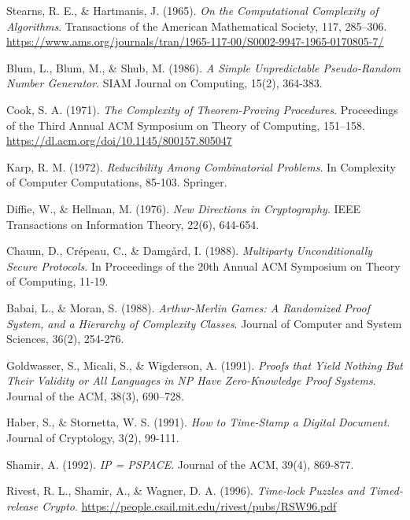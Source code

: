 \documentclass[12pt]{report}
\begin{document}
\begin{thebibliography}{9}

Stearns, R. E., \& Hartmanis, J. (1965). \textit{On the Computational Complexity of Algorithms}. Transactions of the American Mathematical Society, 117, 285–306. \url{https://www.ams.org/journals/tran/1965-117-00/S0002-9947-1965-0170805-7/}

Blum, L., Blum, M., \& Shub, M. (1986). \textit{A Simple Unpredictable Pseudo-Random Number Generator}. SIAM Journal on Computing, 15(2), 364-383.

Cook, S. A. (1971). \textit{The Complexity of Theorem-Proving Procedures}. Proceedings of the Third Annual ACM Symposium on Theory of Computing, 151–158. \url{https://dl.acm.org/doi/10.1145/800157.805047}

Karp, R. M. (1972). \textit{Reducibility Among Combinatorial Problems}. In Complexity of Computer Computations, 85-103. Springer.

Diffie, W., \& Hellman, M. (1976). \textit{New Directions in Cryptography}. IEEE Transactions on Information Theory, 22(6), 644-654.

Chaum, D., Crépeau, C., \& Damgård, I. (1988). \textit{Multiparty Unconditionally Secure Protocols}. In Proceedings of the 20th Annual ACM Symposium on Theory of Computing, 11-19.

Babai, L., \& Moran, S. (1988). \textit{Arthur-Merlin Games: A Randomized Proof System, and a Hierarchy of Complexity Classes}. Journal of Computer and System Sciences, 36(2), 254-276.

Goldwasser, S., Micali, S., \& Wigderson, A. (1991). \textit{Proofs that Yield Nothing But Their Validity or All Languages in NP Have Zero-Knowledge Proof Systems}. Journal of the ACM, 38(3), 690–728.

Haber, S., \& Stornetta, W. S. (1991). \textit{How to Time-Stamp a Digital Document}. Journal of Cryptology, 3(2), 99-111.

Shamir, A. (1992). \textit{IP = PSPACE}. Journal of the ACM, 39(4), 869-877.

Rivest, R. L., Shamir, A., \& Wagner, D. A. (1996). \textit{Time-lock Puzzles and Timed-release Crypto}. \url{https://people.csail.mit.edu/rivest/pubs/RSW96.pdf}


\end{thebibliography}
\end{document}
